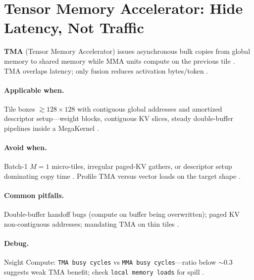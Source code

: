 \section{Tensor Memory Accelerator: Hide Latency, Not Traffic}
\label{sec:tma}

\textbf{TMA} (Tensor Memory Accelerator) issues asynchronous bulk copies from global memory to shared memory while MMA units compute on the previous tile \citep{nvidia2022hopper,semianalysis2024tma}.
TMA overlaps latency; only fusion reduces activation bytes/token \citep{memoryfloor2026}.

\paragraph{Applicable when.}
Tile boxes ${\gtrsim}128{\times}128$ with contiguous global addresses and amortized descriptor setup---weight blocks, contiguous KV slices, steady double-buffer pipelines inside a MegaKernel \citep{semianalysis2024tma,dao2023flashdecoding}.

\paragraph{Avoid when.}
Batch-1 $M{=}1$ micro-tiles, irregular paged-KV gathers, or descriptor setup dominating copy time \citep{kwon2023vllm,taxbreak2026}.
Profile TMA versus vector loads on the target shape \citep{yirage2026}.

\paragraph{Common pitfalls.}
Double-buffer handoff bugs (compute on buffer being overwritten); paged KV non-contiguous addresses; mandating TMA on thin tiles \citep{dao2023flashdecoding,patel2025llminference}.

\paragraph{Debug.}
Nsight Compute: \texttt{TMA busy cycles} vs \texttt{MMA busy cycles}---ratio below ${\sim}0.3$ suggests weak TMA benefit; check \texttt{local memory loads} for spill \citep{semianalysis2024tma}.

